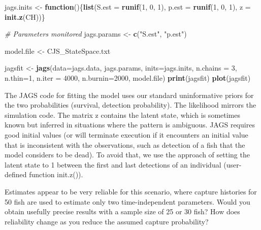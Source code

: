 \documentclass[
]{krantz}
\makeatletter
\newenvironment{Shaded}{\begin{snugshade}}{\end{snugshade}}
\newcommand{\AttributeTok}[1]{\textcolor[rgb]{0.27,0.27,0.27}{#1}}
\newcommand{\CommentTok}[1]{\textcolor[rgb]{0.37,0.37,0.37}{\textit{#1}}}
\newcommand{\ControlFlowTok}[1]{\textcolor[rgb]{0.27,0.27,0.27}{\textbf{#1}}}
\newcommand{\DecValTok}[1]{\textcolor[rgb]{0.06,0.06,0.06}{#1}}
\newcommand{\FunctionTok}[1]{\textcolor[rgb]{0.27,0.27,0.27}{\textbf{#1}}}
\newcommand{\NormalTok}[1]{#1}
\newcommand{\OtherTok}[1]{\textcolor[rgb]{0.37,0.37,0.37}{#1}}
\newcommand{\StringTok}[1]{\textcolor[rgb]{0.5,0.5,0.5}{#1}}
\newenvironment{kframe}{%
\medskip{}
\setlength{\fboxsep}{.8em}
 \def\at@end@of@kframe{}%
 \ifinner\ifhmode%
  \def\at@end@of@kframe{\end{minipage}}%
  \begin{minipage}{\columnwidth}%
 \fi\fi%
 \def\FrameCommand##1{\hskip\@totalleftmargin \hskip-\fboxsep
 \colorbox{shadecolor}{##1}\hskip-\fboxsep
     \hskip-\linewidth \hskip-\@totalleftmargin \hskip\columnwidth}%
 \MakeFramed {\advance\hsize-\width
   \@totalleftmargin\z@ \linewidth\hsize
   \@setminipage}}%
 {\par\unskip\endMakeFramed%
 \at@end@of@kframe}
\renewenvironment{Shaded}{\begin{kframe}}{\end{kframe}}
\makeatother
\begin{document}
\begin{Shaded}
\begin{Highlighting}[]
\NormalTok{jags.inits }\OtherTok{\textless{}{-}} \ControlFlowTok{function}\NormalTok{()\{}\FunctionTok{list}\NormalTok{(}\AttributeTok{S.est =} \FunctionTok{runif}\NormalTok{(}\DecValTok{1}\NormalTok{, }\DecValTok{0}\NormalTok{, }\DecValTok{1}\NormalTok{), }\AttributeTok{p.est =} \FunctionTok{runif}\NormalTok{(}\DecValTok{1}\NormalTok{, }\DecValTok{0}\NormalTok{, }\DecValTok{1}\NormalTok{),}
                              \AttributeTok{z =} \FunctionTok{init.z}\NormalTok{(CH))\}}

\CommentTok{\# Parameters monitored}
\NormalTok{jags.params }\OtherTok{\textless{}{-}} \FunctionTok{c}\NormalTok{(}\StringTok{"S.est"}\NormalTok{, }\StringTok{"p.est"}\NormalTok{)}

\NormalTok{model.file }\OtherTok{\textless{}{-}} \StringTok{\textquotesingle{}CJS\_StateSpace.txt\textquotesingle{}}

\NormalTok{jagsfit }\OtherTok{\textless{}{-}} \FunctionTok{jags}\NormalTok{(}\AttributeTok{data=}\NormalTok{jags.data, jags.params, }\AttributeTok{inits=}\NormalTok{jags.inits,}
                \AttributeTok{n.chains =} \DecValTok{3}\NormalTok{, }\AttributeTok{n.thin=}\DecValTok{1}\NormalTok{, }\AttributeTok{n.iter =} \DecValTok{4000}\NormalTok{, }\AttributeTok{n.burnin=}\DecValTok{2000}\NormalTok{,}
\NormalTok{                model.file)}
\FunctionTok{print}\NormalTok{(jagsfit)}
\FunctionTok{plot}\NormalTok{(jagsfit)}
\end{Highlighting}
\end{Shaded}

The JAGS code for fitting the model uses our standard uninformative priors for the two probabilities (survival, detection probability). The likelihood mirrors the simulation code. The matrix z contains the latent state, which is sometimes known but inferred in situations where the pattern is ambiguous. JAGS requires good initial values (or will terminate execution if it encounters an initial value that is inconsistent with the observations, such as detection of a fish that the model considers to be dead). To avoid that, we use the \citet{kéry.schaub_2011} approach of setting the latent state to 1 between the first and last detections of an individual (user-defined function init.z()).

Estimates appear to be very reliable for this scenario, where capture histories for 50 fish are used to estimate only two time-independent parameters. Would you obtain usefully precise results with a sample size of 25 or 30 fish? How does reliability change as you reduce the assumed capture probability?
\end{document}
